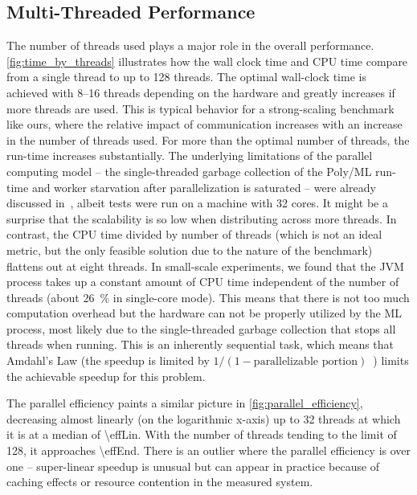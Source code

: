 \subsection{Multi-Threaded Performance}\label{sec:performance_threads}
The number of threads used plays a major role in the overall performance.
\autoref{fig:time_by_threads} illustrates how the wall clock time and CPU time compare from a single thread to up to \num{128} threads.
The optimal wall-clock time is achieved with \numrange{8}{16} threads
depending on the hardware and greatly increases if more threads are used.
This is typical behavior for a strong-scaling benchmark like ours,
where the relative impact of communication increases with an increase in the number of threads used.
For more than the optimal number of threads,
the run-time increases substantially.
The underlying limitations of the parallel computing model 
-- the single-threaded garbage collection of the Poly/ML run-time and worker starvation after parallelization is saturated --
were already discussed in~\cite{PolyParallel2010Matthews},
albeit tests were run on a machine with 32 cores.
It might be a surprise that the scalability is so low when distributing across more threads.
In contrast,
the CPU time divided by number of threads
(which is not an ideal metric, but the only feasible solution due to the nature of the benchmark)
flattens out at eight threads.
In small-scale experiments, we found that the JVM process takes up a constant amount of CPU time independent of the number of threads (about \SI{26}{\percent} in single-core mode).
This means that there is not too much computation overhead
but the hardware can not be properly utilized by the ML process,
most likely due to the single-threaded garbage collection that stops all threads when running.
This is an inherently sequential task, which means that Amdahl's Law (the speedup is limited by $1 / (1-\text{parallelizable portion})$~\cite{amdahls}) limits the achievable speedup for this problem.


The parallel efficiency paints a similar picture in \autoref{fig:parallel_efficiency},
decreasing  almost linearly (on the logarithmic x-axis) up to \num{32} threads
at which it is at a median of \num[round-mode=places,round-precision=3]{\effLin}.
With the number of threads tending to the limit of \num{128},
it approaches \num[round-mode=places,round-precision=3]{\effEnd}.
There is an outlier where the parallel efficiency is over one --
super-linear speedup is unusual but can appear in practice because of caching effects or resource contention in the measured system.




